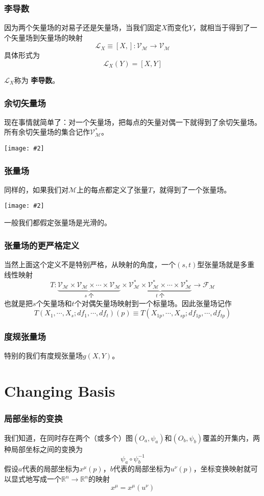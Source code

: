 \documentclass[CJK]{beamer}
\newcommand{\field}{\mathscr{F}}
\newcommand{\reals}{\mathbb{R}}
\newcommand{\mani}{\mathcal{M}}
\newcommand{\cpic}[2]{
\begin{center}
\texttt{[image: \#2]}
\end{center}
}
\begin{document}
\begin{frame}
\frametitle{\bch 李导数 \ech}
\bch
因为两个矢量场的对易子还是矢量场，当我们固定$X$而变化$Y$，就相当于得到了一个矢量场到矢量场的映射
$$
\mathcal{L}_X\equiv [X,]: \mathcal{V}_\mani \to \mathcal{V}_\mani
$$
具体形式为
$$
\mathcal{L}_X(Y) = [X,Y]
$$

$\mathcal{L}_X$称为{\color{purple} \bf 李导数}。
\ech
\end{frame}

\begin{frame}
\frametitle{\bch 余切矢量场 \ech}
\bch
现在事情就简单了：对一个矢量场，把每点的矢量对偶一下就得到了余切矢量场。所有余切矢量场的集合记作$\mathcal{V}^*_\mani$。
\cpic{0.2}{good}
\ech
\end{frame}

\begin{frame}
\frametitle{\bch 张量场 \ech}
\bch
同样的，如果我们对$\mani$上的每点都定义了张量$T$，就得到了一个张量场。
\cpic{0.3}{happy}
一般我们都假定张量场是光滑的。
\ech
\end{frame}

\begin{frame}
\frametitle{\bch 张量场的更严格定义 \ech}
\bch
当然上面这个定义不是特别严格，从映射的角度，一个$(s,t)$型张量场就是多重线性映射
$$
T: \underbrace{\mathcal{V}_\mani\times \mathcal{V}_\mani\times \cdots \times \mathcal{V}_\mani}_{s\text{ 个}} \times  \underbrace{\mathcal{V}^*_\mani \times \mathcal{V}^*_\mani \times \cdots \times \mathcal{V}^*_\mani}_{t\text{ 个}} \to \field_\mani
$$
也就是把$s$个矢量场和$t$个对偶矢量场映射到一个标量场。因此张量场记作
$$T(X_1,\cdots,X_s;df_1,\cdots,df_t)(p) \equiv T(X_{1p},\cdots,X_{sp};df_{1p},\cdots,df_{tp}) $$

\ech
\end{frame}

\begin{frame}
\frametitle{\bch 度规张量场 \ech}
\bch
特别的我们有度规张量场$g(X,Y)$。
\ech
\end{frame}



\section{Changing Basis}

\begin{frame}
\frametitle{\bch 局部坐标的变换 \ech}
\bch
我们知道，在同时存在两个（或多个）图$(O_a,\psi_a)$和$(O_b,\psi_b)$覆盖的开集内，两种局部坐标之间的变换为
$$
\psi_a \circ \psi_b^{-1}
$$
假设$a$代表的局部坐标为$x^\mu(p)$，$b$代表的局部坐标为$u^\nu (p)$，坐标变换映射就可以显式地写成一个$\reals^n \to \reals^n$的映射
$$
x^\mu = x^\mu ( u^\nu) 
$$
\ech
\end{frame}
\end{document}
